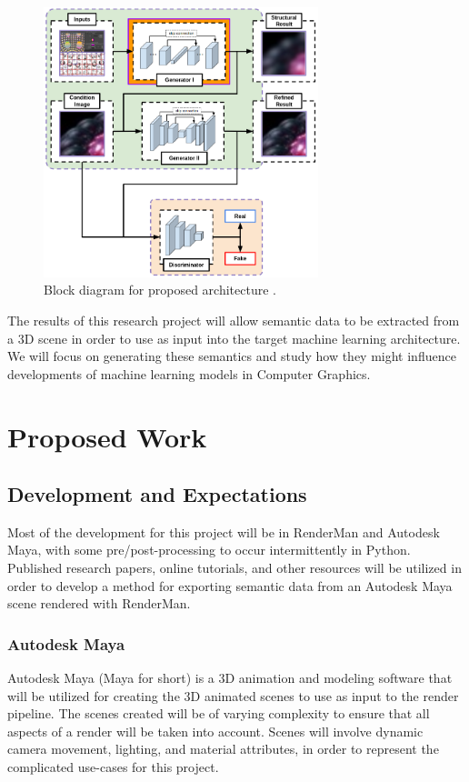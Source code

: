 \documentclass[conference]{IEEEtran}
\begin{document}
\begin{figure}[htbp]
\centerline{\includegraphics[width=8cm]{block_diagram.png}}
\caption{Block diagram for proposed architecture \cite{thesis_harris}.}
\label{fig:block_diagram}
\end{figure}

The results of this research project will allow semantic data to be
extracted from a 3D scene in order to use as input into
the target machine learning architecture.
We will focus on generating these semantics and study
how they might influence developments of
machine learning models in Computer Graphics.

\section{Proposed Work}
\label{sec:proposed_work}
\subsection{Development and Expectations}
Most of the development for this project will be in RenderMan and Autodesk Maya,
with some pre/post-processing to occur intermittently in Python.
Published research papers, online tutorials, and other resources will be
utilized in order to develop a method for exporting semantic data from an Autodesk Maya scene
rendered with RenderMan.

\subsubsection{Autodesk Maya}
Autodesk Maya (Maya for short) is a 3D animation and modeling software that will be utilized
for creating the 3D animated scenes to use as input to the render pipeline.
The scenes created will be of varying complexity to ensure that all aspects of a
render will be taken into account.
Scenes will involve dynamic camera movement, lighting, and material attributes, in order
to represent the complicated use-cases for this project.
\end{document}
